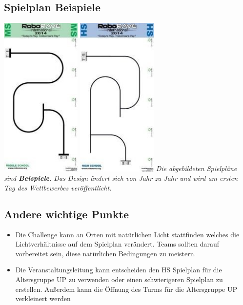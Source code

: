 \documentclass[a4paper,12pt]{article}
\begin{document}
\subsection{Spielplan Beispiele}
\includegraphics[width=0.3\textwidth]{track_ms_lf.png}
\includegraphics[width=0.3\textwidth]{track_hs_lf.png}
\emph{Die abgebildeten Spielpläne sind \textbf{Beispiele}. Das Design ändert sich von Jahr zu
Jahr und wird am ersten Tag des Wettbewerbes veröffentlicht.}
\subsection{Andere wichtige Punkte }
\begin{itemize}
	\item Die Challenge kann an Orten mit natürlichen Licht stattfinden
		welches die Lichtverhältnisse auf dem Spielplan verändert.
		Teams sollten darauf vorbereitet sein, diese natürlichen
		Bedingungen zu meistern.
	\item Die Veranstaltungsleitung kann entscheiden den HS Spielplan für
		die Altersgruppe UP zu verwenden oder einen schwierigeren
		Spielplan zu erstellen. Außerdem kann die Öffnung des Turms für
		die Altersgruppe UP verkleinert werden
\end{itemize}
\end{document}
